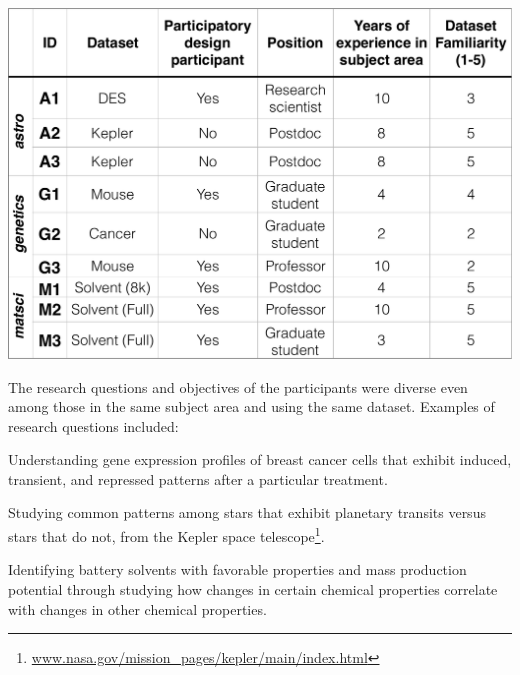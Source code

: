 
\begin{table}[h]
\centering
\vspace{-10pt}
\includegraphics[width=\linewidth]{figures/participants.pdf}
\caption{Participant information. The Likert scale used for dataset familiarity ranges from 1 (not at all familiar) to 5 (extremely familiar).}
\label{participants}
\vspace{-10pt}
\end{table}

\par The research questions and objectives of the participants were diverse even among those in the same subject area and using the same dataset. Examples of research questions included: 
\begin{denselist}
\item Understanding gene expression profiles of breast cancer cells that exhibit induced, transient, and repressed patterns after a particular treatment.
\item Studying common patterns among stars that exhibit planetary transits versus stars that do not, from the Kepler space telescope\footnote{\url{www.nasa.gov/mission_pages/kepler/main/index.html}}.
\item Identifying battery solvents with favorable properties and mass production potential through studying how changes in certain chemical properties correlate with changes in other chemical properties. 
\end{denselist}

